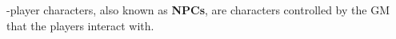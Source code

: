 
-player characters, also known as \textbf{NPCs}, are characters controlled by the GM that the players interact with. 